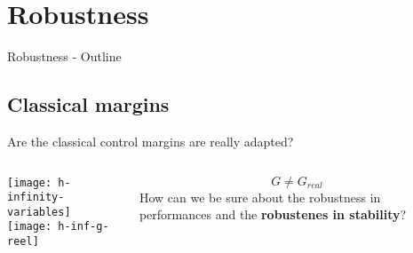\documentclass[../main/main.tex]{subfiles}
\begin{document}
\onlyinsubfile{%

}

\section{Robustness}
\label{sec:robustness}

\begin{frame}{Robustness - Outline}
\end{frame}

\subsection{Classical margins}
\begin{frame}{Are the classical control margins are really adapted?}
  \begin{columns}
    \begin{column}{0.7\textwidth}
      \texttt{[image: h-infinity-variables]}\\\vspace{1em}
      \texttt{[image: h-inf-g-reel]}
    \end{column}
    \begin{column}{0.3\textwidth}
      \[ G \neq G_{real} \]
      How can we be sure about the robustness in performances and the \textbf{robustenes in stability}?
    \end{column}
  \end{columns}
\end{frame}
\end{document}
